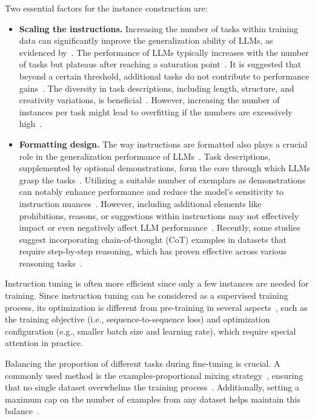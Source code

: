 Two essential factors for the instance construction are:
\begin{itemize}
	\item \textbf{Scaling the instructions.} {Increasing the number of tasks within training data can significantly improve the generalization ability of LLMs, as evidenced by~\textcite{wei2022fine, sanh2021distilbert, chowdhery2022palm}. The performance of LLMs typically increases with the number of tasks but plateaus after reaching a saturation point~\cite{raffel2023exploring, chowdhery2022palm}. It is suggested that beyond a certain threshold, additional tasks do not contribute to performance gains~\cite{raffel2023exploring}. The diversity in task descriptions, including length, structure, and creativity variations, is beneficial~\cite{wei2022fine}. However, increasing the number of instances per task might lead to overfitting if the numbers are excessively high~\cite{chowdhery2022palm, chen2023maybe}.}
	\item \textbf{Formatting design.} {
		      The way instructions are formatted also plays a crucial role in the generalization performance of LLMs~\cite{chowdhery2022palm}. Task descriptions, supplemented by optional demonstrations, form the core through which LLMs grasp the tasks~\cite{chowdhery2022palm}. Utilizing a suitable number of exemplars as demonstrations can notably enhance performance and reduce the model's sensitivity to instruction nuances~\cite{sanh2021distilbert, raffel2023exploring}. However, including additional elements like prohibitions, reasons, or suggestions within instructions may not effectively impact or even negatively affect LLM performance~\cite{chowdhery2022palm, mishra2022crosstask}. Recently, some studies suggest incorporating chain-of-thought (CoT) examples in datasets that require step-by-step reasoning, which has proven effective across various reasoning tasks~\cite{raffel2023exploring, iyer2022opt}.
	      }
\end{itemize}

Instruction tuning is often more efficient since only a few instances are needed for training.
Since instruction tuning can be considered as a supervised training process, its optimization is different from pre-training in several aspects~\cite{chung2022scaling}, such as the training objective (i.e., sequence-to-sequence loss) and optimization
configuration (e.g., smaller batch size and learning rate), which require special attention in practice.

Balancing the proportion of different tasks during fine-tuning is crucial.
A commonly used method is the examples-proportional mixing strategy~\cite{raffel2023exploring}, ensuring that no single dataset overwhelms the training process~\cite{raffel2023exploring, wei2022fine}.
Additionally, setting a maximum cap on the number of examples from any dataset helps maintain this balance~\cite{raffel2023exploring, wei2022fine}.

